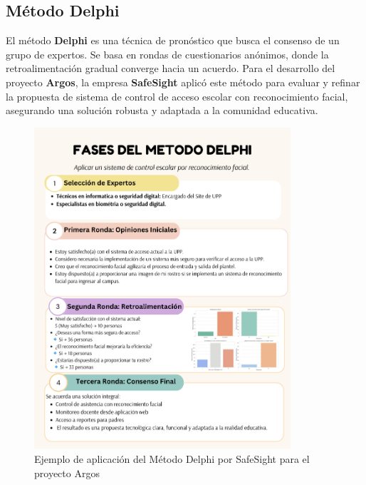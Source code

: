 
\subsection{Método Delphi}

El método \textbf{Delphi} es una técnica de pronóstico que busca el consenso de un grupo de expertos. Se basa en rondas de cuestionarios anónimos, donde la retroalimentación gradual converge hacia un acuerdo. Para el desarrollo del proyecto \textbf{Argos}, la empresa \textbf{SafeSight} aplicó este método para evaluar y refinar la propuesta de sistema de control de acceso escolar con reconocimiento facial, asegurando una solución robusta y adaptada a la comunidad educativa.

\begin{figure}[H]
    \centering
    \includegraphics[width=0.85\textwidth]{./Media/Delphi.png}
    \caption{Ejemplo de aplicación del Método Delphi por SafeSight para el proyecto Argos}
    \label{fig:delphi}
\end{figure}